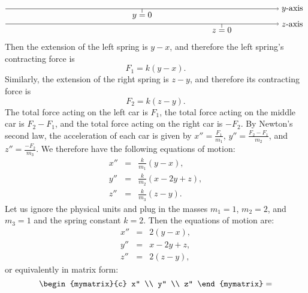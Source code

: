 \begin{solution}
\begin{equation*}
\begin{tikzpicture}[scale=0.8, color=blue!50!black]
\begin{scope}[yshift=-0.5cm, color=black]
      \end{scope}
      \begin{scope}[yshift=-1.3cm, color=black]
        \draw[->] (0,0) -- (14.4,0) node[right] {$y$-axis};
        \draw (7.2,0) -- +(0,-0.2) node[below=-4pt] {$y=0$};
      \end{scope}
      \begin{scope}[yshift=-2.1cm, color=black]
        \draw[->] (0,0) -- (14.4,0) node[right] {$z$-axis};
        \draw (11.4,0) -- +(0,-0.2) node[below=-4pt] {$z=0$};
      \end{scope}
    \end{tikzpicture}
  \end{equation*}
  Then the extension of the left spring is $y-x$, and therefore the
  left spring's contracting force is
  \begin{equation*}
    F_1 = k(y-x).
  \end{equation*}
  Similarly, the extension of the right spring is $z-y$, and therefore
  its contracting force is
  \begin{equation*}
    F_2 = k(z-y).
  \end{equation*}
  The total force acting on the left car is $F_1$, the total force
  acting on the middle car is $F_2-F_1$, and the total force acting on
  the right car is $-F_2$. By Newton's second law, the acceleration
  of each car is given by $x'' = \frac{F_1}{m_1}$,
  $y'' = \frac{F_2-F_1}{m_2}$, and $z''=\frac{-F_2}{m_3}$. We
  therefore have the following equations of motion:
  \begin{eqnarray*}
    x'' &=& \frac{k}{m_1}(y-x), \\
    y'' &=& \frac{k}{m_2}(x-2y+z), \\
    z'' &=& \frac{k}{m_3}(z-y).
  \end{eqnarray*}
  Let us ignore the physical units and plug in the masses $m_1=1$,
  $m_2=2$, and $m_3=1$ and the spring constant $k=2$. Then the equations
  of motion are:
  \begin{eqnarray*}
    x'' &=& 2(y-x), \\
    y'' &=& x-2y+z, \\
    z'' &=& 2(z-y),
  \end{eqnarray*}
  or equivalently in matrix form:
  \begin{equation*}
    \begin{mymatrix}{c} x'' \\ y'' \\ z'' \end{mymatrix}
    =

\end{equation*}
\end{solution}
